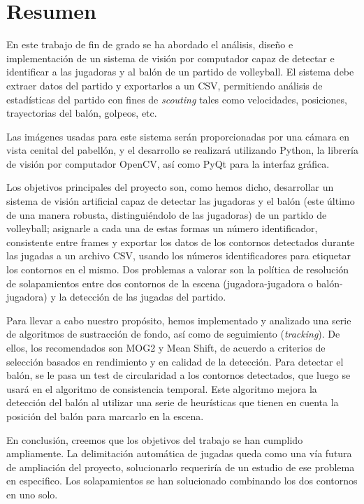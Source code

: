 \section*{Resumen}
En este trabajo de fin de grado se ha abordado el análisis, diseño e implementación de un sistema de visión por computador capaz de detectar e identificar a las jugadoras y al balón de un partido de volleyball. El sistema debe extraer datos del partido y exportarlos a un CSV, permitiendo análisis de estadísticas del partido con fines de \textit{scouting} tales como velocidades, posiciones, trayectorias del balón, golpeos, etc. 

Las imágenes usadas para este sistema serán proporcionadas por una cámara en vista cenital del pabellón, y el desarrollo se realizará utilizando Python, la librería de visión por computador OpenCV, así como PyQt para la interfaz gráfica.

Los objetivos principales del proyecto son, como hemos dicho, desarrollar un sistema de visión artificial capaz de detectar las jugadoras y el balón (este último de una manera robusta, distinguiéndolo de las jugadoras) de un partido de volleyball; asignarle a cada una de estas formas un número identificador, consistente entre frames y exportar los datos de los contornos detectados durante las jugadas a un archivo CSV, usando los números identificadores para etiquetar los contornos en el mismo. Dos problemas a valorar son la política de resolución de solapamientos entre dos contornos de la escena (jugadora-jugadora o balón-jugadora) y la detección de las jugadas del partido.

Para llevar a cabo nuestro propósito, hemos implementado y analizado una serie de algoritmos de sustracción de fondo, así como de seguimiento (\textit{tracking}). De ellos, los recomendados son MOG2 y Mean Shift, de acuerdo a criterios de selección basados en rendimiento y en calidad de la detección. Para detectar el balón, se le pasa un test de circularidad a los contornos detectados, que luego se usará en el algoritmo de consistencia temporal. Este algoritmo mejora la detección del balón al utilizar una serie de heurísticas que tienen en cuenta la posición del balón para marcarlo en la escena.

En conclusión, creemos que los objetivos del trabajo se han cumplido ampliamente. La delimitación automática de jugadas queda como una vía futura de ampliación del proyecto, solucionarlo requeriría de un estudio de ese problema en especifico. Los solapamientos se han solucionado combinando los dos contornos en uno solo. 



